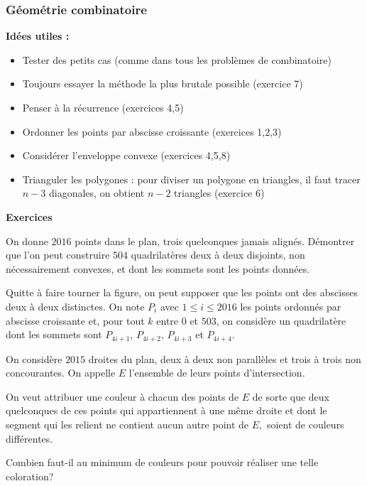 \subsubsection*{Géométrie combinatoire}

\textbf{Idées utiles :}
\begin{itemize}
\item
Tester des petits cas (comme dans tous les problèmes de combinatoire)
\item
Toujours essayer la méthode la plus brutale possible (exercice 7)
\item
Penser à la récurrence (exercices 4,5)
\item
Ordonner les points par abscisse croissante (exercices 1,2,3)
\item
Considérer l'enveloppe convexe (exercices 4,5,8)
\item
Trianguler les polygones : pour diviser un polygone en triangles, il faut tracer $n-3$ diagonales, on obtient $n-2$ triangles (exercice 6)
\end{itemize}

\bigskip

\textbf{Exercices}

\bigskip

\begin{exo}
On donne $2016$ points dans le plan, trois quelconques jamais align\'{e}s.
D\'{e}montrer que l'on peut construire $504$ quadrilat\`{e}res deux \`{a}
deux disjoints, non n\'{e}cessairement convexes, et dont les sommets sont
les points donn\'{e}es.
\end{exo}

\begin{sol}
Quitte à faire tourner la figure, on peut supposer que les points ont des abscisses deux à deux distinctes. On note $P_i$ avec $1 \leq i \leq 2016$ les points ordonnés par abscisse croissante et, pour tout $k$ entre $0$ et $503$, on considère un quadrilatère dont les sommets sont $P_{4i+1}$, $P_{4i+2}$, $P_{4i+3}$ et $P_{4i+4}$.
\end{sol}

\begin{exo}
On consid\`{e}re $2015$ droites du plan, deux à deux non parallèles et trois à trois non concourantes. On appelle $E$ l'ensemble de leurs points d'intersection.

On veut attribuer une couleur \`{a} chacun des points de $E$ de sorte que
deux quelconques de ces points qui appartiennent \`{a} une m\^{e}me droite
et dont le segment qui les relient ne contient aucun autre point de $E,$
soient de couleurs diff\'{e}rentes.

Combien faut-il au minimum de couleurs pour pouvoir r\'{e}aliser une telle coloration?
\end{exo}

